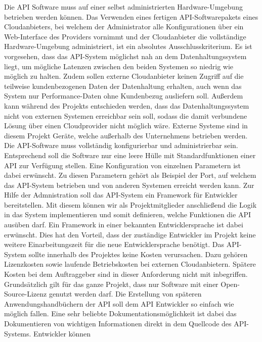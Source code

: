 \begin{outline}
  \1 Die API Software muss auf einer selbst administrierten Hardware-Umgebung
  betrieben werden können. Das Verwenden eines fertigen API-Softwarepakets
  eines Cloudanbieters, bei welchem der Administrator alle Konfigurationen
  über ein Web-Interface des Providers vornimmt und der Cloudanbieter die
  vollständige Hardware-Umgebung administriert, ist ein absolutes
  Ausschlusskriterium. Es ist vorgesehen, dass das API-System möglichst nah an
  dem Datenhaltungssystem liegt, um mögliche Latenzen zwischen den beiden
  Systemen so niedrig wie möglich zu halten. Zudem sollen externe Cloudanbieter
  keinen Zugriff auf die teilweise kundenbezogenen Daten der Datenhaltung
  erhalten, auch wenn das System nur Performance-Daten ohne Kundenbezug
  ausliefern soll. Außerdem kann während des Projekts entschieden werden, dass
  das Datenhaltungssystem nicht von externen Systemen erreichbar sein soll,
  sodass die damit verbundene Lösung über einen Cloudprovider nicht möglich
  wäre. Externe Systeme sind in diesem Projekt Geräte, welche außerhalb des
  Unternehmens betrieben werden.
  \1 Die API-Software muss vollständig konfigurierbar und administrierbar sein.
  Entsprechend soll die Software nur eine leere Hülle mit Standardfunktionen
  einer API zur Verfügung stellen. Eine Konfiguration von einzelnen Parametern
  ist dabei erwünscht. Zu diesen Parametern gehört als Beispiel der Port, auf
  welchem das API-System betrieben und von anderen Systemen erreicht werden
  kann. Zur Hilfe der Admnistration soll das API-System ein Framework für
  Entwickler bereitstellen. Mit diesem können wir als Projektmitglieder
  anschließend die Logik in das System implementieren und somit definieren,
  welche Funktionen die API ausüben darf. Ein Framework in einer bekannten
  Entwicklersprache ist dabei erwünscht. Dies hat den Vorteil, dass der
  zuständige Entwickler im Projekt keine weitere Einarbeitungszeit für die neue
  Entwicklersprache benötigt.
  \1 Das API-System sollte innerhalb des Projektes keine Kosten verursachen.
  Dazu gehören Lizenzkosten sowie laufende Betriebskosten bei externen
  Cloudanbietern. Spätere Kosten bei dem Auftraggeber sind in dieser
  Anforderung nicht mit inbegriffen. Grundsätzlich gilt für das ganze Projekt,
  dass nur Software mit einer Open-Source-Lizenz genutzt werden darf.
  \1 Die Erstellung von späteren Anwendungshandbüchern der API soll dem API
  Entwickler so einfach wie möglich fallen. Eine sehr beliebte
  Dokumentationsmöglichkeit ist dabei das Dokumentieren von wichtigen
  Informationen direkt in dem Quellcode des API-Systems. Entwickler können

\end{outline}
